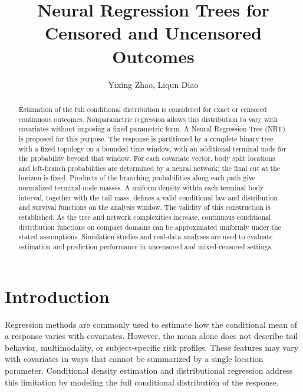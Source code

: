 \documentclass[11pt]{article}
\numberwithin{equation}{section}
\begin{document}
\newcommand{\argmin}{\operatornamewithlimits{argmin}}
\newcommand{\mc}[1]{\mathcal{#1}}

\title{Neural Regression Trees for Censored and Uncensored Outcomes}
\author{Yixing Zhao, Liqun Diao}
\maketitle
\begin{abstract}
Estimation of the full conditional distribution is considered for exact or censored continuous outcomes. Nonparametric regression allows this distribution to vary with covariates without imposing a fixed parametric form. A Neural Regression Tree (NRT) is proposed for this purpose. The response is partitioned by a complete binary tree with a fixed topology on a bounded time window, with an additional terminal node for the probability beyond that window. For each covariate vector, body split locations and left-branch probabilities are determined by a neural network; the final cut at the horizon is fixed. Products of the branching probabilities along each path give normalized terminal-node masses. A uniform density within each terminal body interval, together with the tail mass, defines a valid conditional law and distribution and survival functions on the analysis window. The validity of this construction is established. As the tree and network complexities increase, continuous conditional distribution functions on compact domains can be approximated uniformly under the stated assumptions. Simulation studies and real-data analyses are used to evaluate estimation and prediction performance in uncensored and mixed-censored settings.
\end{abstract}

\section{Introduction}

Regression methods are commonly used to estimate how the conditional mean of a response varies with covariates. However, the mean alone does not describe tail behavior, multimodality, or subject-specific risk profiles. These features may vary with covariates in ways that cannot be summarized by a single location parameter. Conditional density estimation and distributional regression address this limitation by modeling the full conditional distribution of the response.
\end{document}

